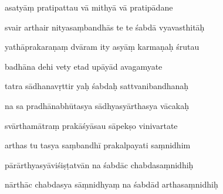\documentclass[article,12pt,a4paper]{memoir}%
\newcounter{parCount}
\begin{document}
	  
	  \pstart {} asatyāṃ pratipattau vā mithyā vā pratipādane 
	{}
	\pend%
      

	  
	  \pstart \leavevmode%
	svair arthair nityasaṃbandhās te te śabdā vyavasthitāḥ 
	{}
	\pend%
      

	  
	  \pstart {} yathāprakaraṇaṃ dvāram ity asyāṃ karmaṇaḥ śrutau 
	{}
	\pend%
      

	  
	  \pstart \leavevmode%
	badhāna dehi vety etad upāyād avagamyate 
	{}
	\pend%
      

	  
	  \pstart {} tatra sādhanavṛttir yaḥ śabdaḥ sattvanibandhanaḥ 
	{}
	\pend%
      

	  
	  \pstart \leavevmode%
	na sa pradhānabhūtasya sādhyasyārthasya vācakaḥ 
	{}
	\pend%
      

	  
	  \pstart {} svārthamātraṃ prakāśyāsau sāpekṣo vinivartate 
	{}
	\pend%
      

	  
	  \pstart \leavevmode%
	arthas tu tasya saṃbandhī prakalpayati saṃnidhim 
	{}
	\pend%
      

	  
	  \pstart {} pārārthyasyāviśiṣṭatvān na śabdāc chabdasaṃnidhiḥ 
	{}
	\pend%
      

	  
	  \pstart \leavevmode%
	nārthāc chabdasya sāṃnidhyaṃ na śabdād arthasaṃnidhiḥ 
	{}
	\pend%
      
\end{document}
